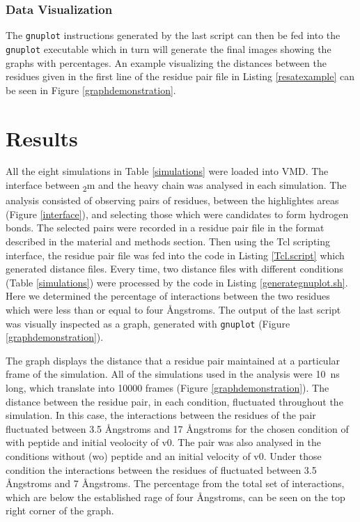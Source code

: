 \documentclass[11pt,twocolumn]{article}
\newcommand{\angstr}{{\AA}ngstroms\xspace}
\newcommand{\btm}{\textbeta\textsubscript{2}m\xspace}
\begin{document}
\subsubsection*{Data Visualization}

The \texttt{gnuplot} instructions generated by the last script can then be fed into the \texttt{gnuplot} executable which in turn will generate the final images showing the graphs with percentages. An example visualizing the distances between the residues given in the first line of the residue pair file in Listing \ref{resatexample} can be seen in Figure \ref{graphdemonstration}.


\section*{Results}

All the eight simulations in Table \ref{simulations} were loaded into VMD. The interface between \btm and the heavy chain was analysed in each simulation. The analysis consisted of observing pairs of residues, between the highlightes areas (Figure \ref{interface}), and selecting those which were candidates to form hydrogen bonds. 
The selected pairs were recorded in a residue pair file in the format described in the material and methods section. Then using the 
Tcl scripting interface, the residue pair file was fed into the code in Listing \ref{Tcl.script} which generated distance files. Every time, two distance files with different conditions (Table \ref{simulations}) were processed by the code in Listing \ref{generategnuplot.sh}. Here we determined the percentage of interactions between the two residues which were less than or equal to four \angstr. The output of the last script  was visually inspected as a graph, generated with \texttt{gnuplot} (Figure \ref{graphdemonstration}).

The graph displays the distance that a residue pair maintained at a particular frame of the simulation. All of the simulations used in the analysis were \SI{10}{\nano\second} long, which translate into 10000 frames (Figure \ref{graphdemonstration}). The distance between the residue pair, in each condition, fluctuated throughout the simulation. In this case, the interactions between the residues of the pair fluctuated between 3.5 \angstr and  17 \angstr for the chosen condition of with peptide and initial veolocity of v0. The pair was also analysed in the conditions without (wo) peptide and an initial velocity of v0. Under those condition the interactions between the residues of  fluctuated between 3.5 \angstr and  7 \angstr.
The percentage from the total set of interactions, which are below the established rage of four \angstr, can be seen on the top right corner of the graph. 
\end{document}

